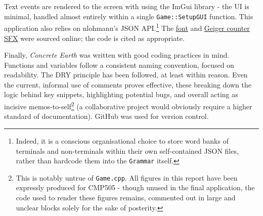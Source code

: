 \documentclass[a4paper, 11pt]{article}
\begin{document}
\begin{flushleft}
\vspace{5pt}\noindent
Text events are rendered to the screen with using the ImGui library - the UI is minimal, handled almost entirely within a single \texttt{Game::SetupGUI} function. This application also relies on nlohmann's JSON API.\footnote{Indeed, it is a conscious organisational choice to store word banks of terminals and non-terminals within their own self-contained JSON files, rather than hardcode them into the \texttt{Grammar} itself.} The \href{https://www.dafont.com/benegraphic.font}{\ul{font}} and \href{https://freesound.org/people/JustLaz/sounds/616516/}{\ul{Geiger counter SFX}} were sourced online; the code is cited as appropriate.

\vspace{5pt}\noindent
Finally, \textit{Concrete Earth} was written with good coding practices in mind. Functions and variables follow a consistent naming convention, focused on readability. The DRY principle has been followed, at least within reason. Even the current, informal use of comments proves effective, these breaking down the logic behind key snippets, highlighting potential bugs, and overall acting as incisive memos-to-self\footnote{This is notably untrue of \texttt{Game.cpp}. All figures in this report have been expressly produced for CMP505 - though unused in the final application, the code used to render these figures remains, commented out in large and unclear blocks solely for the sake of posterity.} (a collaborative project would obviously require a higher standard of documentation). GitHub was used for version control.


\end{flushleft}
\end{document}
